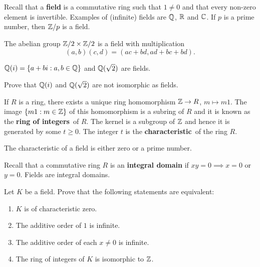 \chapter{}


Recall that a \textbf{field} is a commutative
ring such that $1\ne 0$ and 
that every non-zero element is invertible. Examples
of (infinite) fields are $\mathbb{Q}$, $\mathbb{R}$ and $\mathbb{C}$. If $p$
is a prime number, then $\mathbb{Z}/p$ is a field. 

\begin{example}
	The abelian group $\mathbb{Z}/2\times\mathbb{Z}/2$ is a field
	with multiplication
	\[
		(a,b)(c,d)=(ac+bd,ad+bc+bd).
	\]
\end{example}

\begin{example}
	$\mathbb{Q}(i)=\{a+bi:a,b\in\mathbb{Q}\}$ and 
	$\mathbb{Q}(\sqrt{2})$ are fields.
\end{example}

\begin{exercise}
	\label{xca:Q(i)}
	Prove that $\mathbb{Q}(i)$ and $\mathbb{Q}(\sqrt{2})$ are not isomorphic as fields.
\end{exercise}

If $R$ is a ring, there exists a unique ring homomorphism
$\mathbb{Z}\to R$, $m\mapsto m1$. The image $\{m1:m\in\mathbb{Z}\}$ 
of this homomorphism is a subring 
of $R$ and it is known as the \textbf{ring of integers} of $R$. The
kernel is a subgroup of $\mathbb{Z}$ and hence  it is generated by
some $t\geq0$. The integer $t$ is 
the \textbf{characteristic} of the ring $R$. 

\begin{exercise}
	The characteristic of a field is either zero or
	a prime number. 
\end{exercise}

Recall that a commutative ring $R$ is an \textbf{integral 
domain} if $xy=0\implies x=0$ or $y=0$. Fields
are integral domains. 

\begin{exercise}
	Let $K$ be a field. Prove that
	the following statements are equivalent:
	\begin{enumerate}
		\item $K$ is of characteristic zero.
		\item The additive order of $1$ is infinite. 
		\item The additive order of each $x\ne0$ is infinite.
		\item The ring of integers of $K$ is isomorphic to $\mathbb{Z}$.
	\end{enumerate}
\end{exercise}

